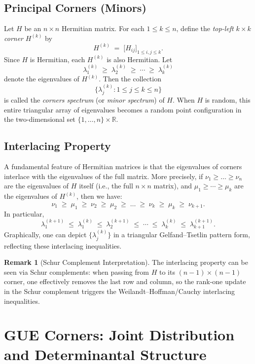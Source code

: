\documentclass[letterpaper,11pt,oneside,reqno]{article}
\numberwithin{equation}{section}
\theoremstyle{definition}
\newtheorem{remark}[proposition]{Remark}
\begin{document}
\subsection{Principal Corners (Minors)}
Let $H$ be an $n\times n$ Hermitian matrix. For each $1\le k\le n$, define the \emph{top-left $k\times k$ corner} $H^{(k)}$ by
\[
	H^{(k)} \;=\; \bigl[H_{ij}\bigr]_{1\le i,j \le k}.
\]
Since $H$ is Hermitian, each $H^{(k)}$ is also Hermitian. Let
\[
	\lambda_1^{(k)} \;\ge\;\lambda_2^{(k)}\;\ge\;\cdots\;\ge\;\lambda_k^{(k)}
\]
denote the eigenvalues of $H^{(k)}$. Then the collection
\[
	\bigl\{\lambda_j^{(k)} : 1\le j\le k \le n\bigr\}
\]
is called the \emph{corners spectrum} (or \emph{minor spectrum}) of $H$. When $H$ is random, this entire triangular array of eigenvalues becomes a random point configuration in the two-dimensional set $\{1,\dots,n\}\times \mathbb{R}$.

\subsection{Interlacing Property}
A fundamental feature of Hermitian matrices is that the eigenvalues of corners interlace with the eigenvalues of the full matrix. More precisely, if $\nu_1\ge\dots\ge \nu_n$ are the eigenvalues of $H$ itself (i.e., the full $n\times n$ matrix), and $\mu_1\ge\cdots\ge\mu_k$ are the eigenvalues of $H^{(k)}$, then we have:
\[
	\nu_1\;\ge\;\mu_1\;\ge\;\nu_2\;\ge\;\mu_2\;\ge\;\dots\;\ge\;\nu_k\;\ge\;\mu_k\;\ge\;\nu_{k+1}.
\]
In particular,
\[
	\lambda_1^{(k+1)}
	\;\le\;\lambda_1^{(k)}\;\le\;\lambda_2^{(k+1)}
	\;\le\;\cdots\;\le\;\lambda_k^{(k)}
	\;\le\;\lambda_{k+1}^{(k+1)}.
\]
Graphically, one can depict $\{\lambda_j^{(k)}\}$ in a triangular Gelfand--Tsetlin pattern form, reflecting these interlacing inequalities.

\begin{remark}[Schur Complement Interpretation]
The interlacing property can be seen via Schur complements: when passing from $H$ to its $(n-1)\times(n-1)$ corner, one effectively removes the last row and column, so the rank-one update in the Schur complement triggers the Weilandt--Hoffman/Cauchy interlacing inequalities.
\end{remark}

\section{GUE Corners: Joint Distribution and Determinantal Structure}
\label{sec:gue-corners}
\end{document}

